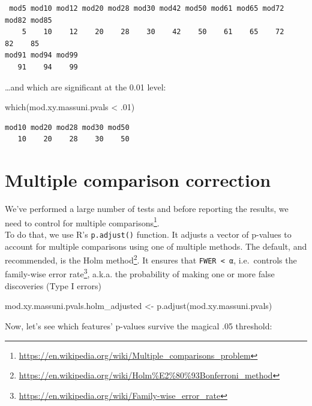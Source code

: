 \documentclass[
]{book}
\newenvironment{Shaded}{\begin{snugshade}}{\end{snugshade}}
\newcommand{\DecValTok}[1]{\textcolor[rgb]{0.00,0.00,0.81}{#1}}
\newcommand{\FunctionTok}[1]{\textcolor[rgb]{0.00,0.00,0.00}{#1}}
\newcommand{\NormalTok}[1]{#1}
\newcommand{\OtherTok}[1]{\textcolor[rgb]{0.56,0.35,0.01}{#1}}
\newcommand{\SpecialCharTok}[1]{\textcolor[rgb]{0.00,0.00,0.00}{#1}}
\DeclareRobustCommand{\href}[2]{#2\footnote{\url{#1}}}
\renewcommand{\href}[2]{#2\footnote{\url{#1}}}
\begin{document}
\begin{verbatim}
 mod5 mod10 mod12 mod20 mod28 mod30 mod42 mod50 mod61 mod65 mod72 mod82 mod85 
    5    10    12    20    28    30    42    50    61    65    72    82    85 
mod91 mod94 mod99 
   91    94    99 
\end{verbatim}

\ldots and which are significant at the 0.01 level:

\begin{Shaded}
\begin{Highlighting}[]
\FunctionTok{which}\NormalTok{(mod.xy.massuni.pvals }\SpecialCharTok{\textless{}}\NormalTok{ .}\DecValTok{01}\NormalTok{)}
\end{Highlighting}
\end{Shaded}

\begin{verbatim}
mod10 mod20 mod28 mod30 mod50 
   10    20    28    30    50 
\end{verbatim}

\hypertarget{multiple-comparison-correction}{%
\section{Multiple comparison correction}\label{multiple-comparison-correction}}

We've performed a large number of tests and before reporting the results, we need to control for \href{https://en.wikipedia.org/wiki/Multiple_comparisons_problem}{multiple comparisons}.\\
To do that, we use R's \texttt{p.adjust()} function. It adjusts a vector of p-values to account for multiple comparisons using one of multiple methods. The default, and recommended, is the \href{https://en.wikipedia.org/wiki/Holm\%E2\%80\%93Bonferroni_method}{Holm method}. It ensures that \texttt{FWER\ \textless{}\ α}, i.e.~controls the \href{https://en.wikipedia.org/wiki/Family-wise_error_rate}{family-wise error rate}, a.k.a. the probability of making one or more false discoveries (Type I errors)

\begin{Shaded}
\begin{Highlighting}[]
\NormalTok{mod.xy.massuni.pvals.holm\_adjusted }\OtherTok{\textless{}{-}} \FunctionTok{p.adjust}\NormalTok{(mod.xy.massuni.pvals)}
\end{Highlighting}
\end{Shaded}

Now, let's see which features' p-values survive the magical .05 threshold:
\end{document}
